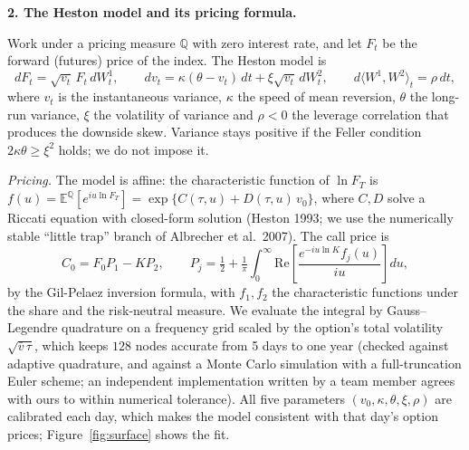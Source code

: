 \documentclass[10pt,leqno]{amsart}
\newcommand{\heading}[1]{\medskip\noindent\textbf{#1}\par}
\newcommand{\E}{\mathbb{E}}
\newcommand{\Q}{\mathbb{Q}}
\begin{document}
\heading{2. The Heston model and its pricing formula.}
\noindent Work under a pricing measure $\Q$ with zero interest rate, and let $F_t$ be the
forward (futures) price of the index. The Heston model is
\begin{equation}\label{eq:heston}
dF_t=\sqrt{v_t}\,F_t\,dW^1_t,\qquad dv_t=\kappa(\theta-v_t)\,dt+\xi\sqrt{v_t}\,dW^2_t,\qquad d\langle W^1,W^2\rangle_t=\rho\,dt,
\end{equation}
where $v_t$ is the instantaneous variance, $\kappa$ the speed of mean reversion, $\theta$
the long-run variance, $\xi$ the volatility of variance and $\rho<0$ the leverage
correlation that produces the downside skew. Variance stays positive if the Feller condition
$2\kappa\theta\ge\xi^2$ holds; we do not impose it.

\emph{Pricing.} The model is affine: the characteristic function of $\ln F_T$ is
$f(u)=\E^\Q[e^{iu\ln F_T}]=\exp\{C(\tau,u)+D(\tau,u)\,v_0\}$, where $C,D$ solve a Riccati
equation with closed-form solution (Heston 1993; we use the numerically stable
``little trap'' branch of Albrecher et al.\ 2007). The call price is
\[
C_0=F_0P_1-KP_2,\qquad P_j=\tfrac12+\tfrac1\pi\int_0^\infty \mathrm{Re}\!\left[\frac{e^{-iu\ln K}f_j(u)}{iu}\right]du ,
\]
by the Gil-Pelaez inversion formula, with $f_1,f_2$ the characteristic functions under the share and
the risk-neutral measure. We evaluate the integral by Gauss--Legendre quadrature on a
frequency grid scaled by the option's total volatility $\sqrt{\bar v\,\tau}$, which keeps $128$ nodes accurate from
5 days to one year (checked against adaptive quadrature, and against a Monte Carlo simulation with
a full-truncation Euler scheme; an independent implementation written by a team member agrees with ours to within numerical tolerance).
All five parameters $(v_0,\kappa,\theta,\xi,\rho)$ are calibrated each day, which makes the model
consistent with that day's option prices; Figure~\ref{fig:surface} shows the fit.
\end{document}
